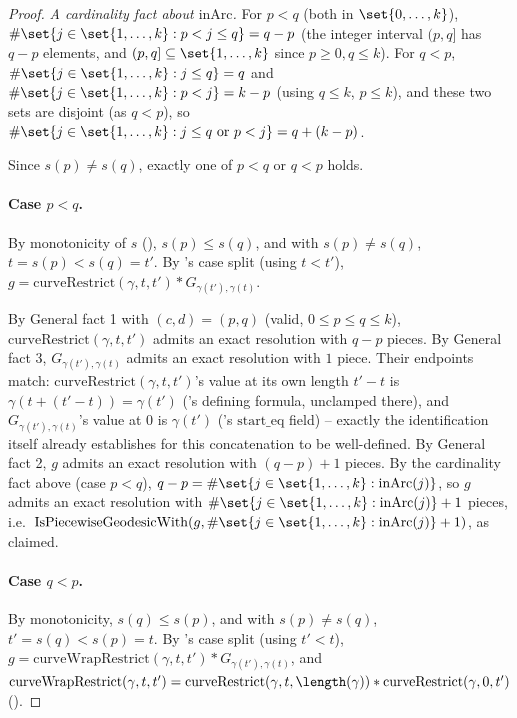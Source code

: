 \begin{proof}
  \emph{A cardinality fact about $\mathrm{inArc}$.} For $p<q$ (both in $\set{0,\dots,k}$),
  $\#\set{j\in\set{1,\dots,k} : p<j\le q} = q-p$ (the integer interval $(p,q]$ has $q-p$ elements,
  and $(p,q]\subseteq\set{1,\dots,k}$ since $p\ge0,q\le k$). For $q<p$,
  $\#\set{j\in\set{1,\dots,k}:j\le q} = q$ and $\#\set{j\in\set{1,\dots,k}:p<j}=k-p$ (using $q\le k$,
  $p\le k$), and these two sets are disjoint (as $q<p$), so
  $\#\set{j\in\set{1,\dots,k}: j\le q \text{ or } p<j} = q+(k-p)$.

  Since $s(p)\ne s(q)$, exactly one of $p<q$ or $q<p$ holds.

  \paragraph{Case $p<q$.} By monotonicity of $s$ (), $s(p)\le s(q)$,
  and with $s(p)\ne s(q)$, $t=s(p)<s(q)=t'$. By 's case split (using $t<t'$),
  $g = \mathrm{curveRestrict}(\gamma,t,t') * G_{\gamma(t'),\gamma(t)}$.

  By General fact 1 with $(c,d)=(p,q)$ (valid, $0\le p\le q\le k$), $\mathrm{curveRestrict}(\gamma,t,
  t')$ admits an exact resolution with $q-p$ pieces. By General fact 3,
  $G_{\gamma(t'),\gamma(t)}$ admits an exact resolution with $1$ piece. Their endpoints match:
  $\mathrm{curveRestrict}(\gamma,t,t')$'s value at its own length $t'-t$ is $\gamma(t+(t'-t)) =
  \gamma(t')$ ('s defining formula, unclamped there), and
  $G_{\gamma(t'),\gamma(t)}$'s value at $0$ is $\gamma(t')$ ('s
  $\mathrm{start\_eq}$ field) -- exactly the identification  itself already
  establishes for this concatenation to be well-defined. By General fact 2, $g$ admits an exact
  resolution with $(q-p)+1$ pieces. By the cardinality fact above (case $p<q$), $q-p =
  \#\set{j\in\set{1,\dots,k}:\mathrm{inArc}(j)}$, so $g$ admits an exact resolution with
  $\#\set{j\in\set{1,\dots,k}:\mathrm{inArc}(j)}+1$ pieces, i.e.\
  $\mathrm{IsPiecewiseGeodesicWith}(g,\#\set{j\in\set{1,\dots,k}:\mathrm{inArc}(j)}+1)$, as claimed.

  \paragraph{Case $q<p$.} By monotonicity, $s(q)\le s(p)$, and with $s(p)\ne s(q)$, $t'=s(q)<s(p)=t$.
  By \noderef{BasicCut}'s case split (using $t'<t$), $g = \mathrm{curveWrapRestrict}(\gamma,t,t') *
  G_{\gamma(t'),\gamma(t)}$, and $\mathrm{curveWrapRestrict}(\gamma,t,t') =
  \mathrm{curveRestrict}(\gamma,t,\length(\gamma)) * \mathrm{curveRestrict}(\gamma,0,t')$
  (\noderef{curveWrapRestrict}).


\end{proof}
